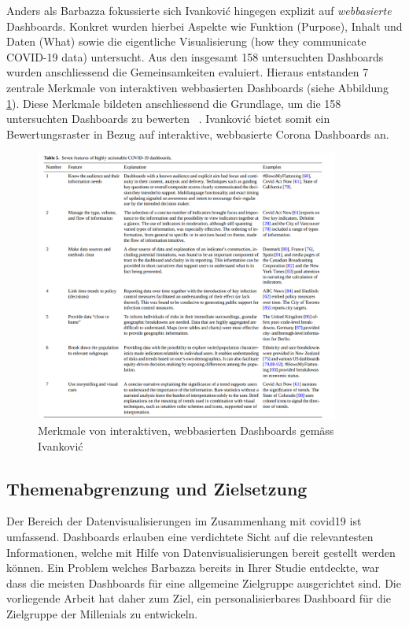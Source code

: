 Anders als Barbazza fokussierte sich Ivankovi{\'c} hingegen explizit auf \textit{webbasierte} Dashboards. Konkret wurden hierbei Aspekte wie Funktion (Purpose), Inhalt und Daten (What) sowie die eigentliche Visualisierung (how they communicate COVID-19 data) untersucht. Aus den insgesamt 158 untersuchten Dashboards wurden anschliessend die Gemeinsamkeiten evaluiert. Hieraus entstanden 7 zentrale Merkmale von interaktiven webbasierten Dashboards (siehe Abbildung \ref{fig:ivankovic_characteristics_of_webbased_dashboards}). Diese Merkmale bildeten anschliessend die Grundlage, um die 158 untersuchten Dashboards zu bewerten ~\citep{ivankovic}. Ivankovi{\'c} bietet somit ein Bewertungsraster in Bezug auf interaktive, webbasierte Corona Dashboards an.


 \begin{figure}[ht]
    \includegraphics[width=10cm]{images/ivankovic_dashboard_characteristics.png}
    \centering
    \caption{Merkmale von interaktiven, webbasierten Dashboards gemäss Ivankovi{\'c} ~\citep[S. 12]{ivankovic}}
    \label{fig:ivankovic_characteristics_of_webbased_dashboards}
\end{figure}


\subsection{Themenabgrenzung und Zielsetzung} \label{ch:introduction_context_specialization}
Der Bereich der Datenvisualisierungen im Zusammenhang mit \gls{covid19} ist umfassend. Dashboards erlauben eine verdichtete Sicht auf die relevantesten Informationen, welche mit Hilfe von Datenvisualisierungen bereit gestellt werden können. Ein Problem welches Barbazza bereits in Ihrer Studie entdeckte, war dass die meisten Dashboards für eine allgemeine Zielgruppe ausgerichtet sind. Die vorliegende Arbeit hat daher zum Ziel, ein personalisierbares Dashboard für die Zielgruppe der Millenials zu entwickeln.

